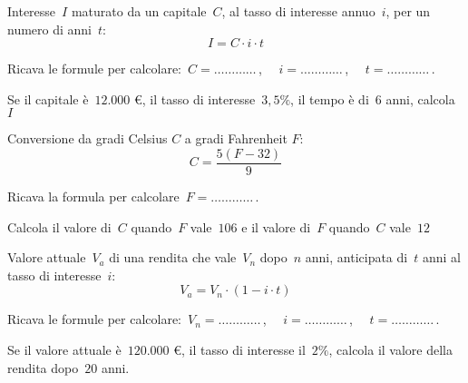 \subsubsection*{}

\begin{esercizio}
\label{ese:20.53}
Interesse~\(I\) maturato da un capitale~\(C\), al tasso di interesse annuo~\(i\), 
per un numero di anni~\(t\):
\begin{equation*}
  I=C\cdot i\cdot t
\end{equation*}

Ricava le formule per calcolare:~\(C=\ldots\ldots\ldots\ldots\)\,, \(\quad 
i=\ldots\ldots\ldots\ldots\)\,, \(\quad t =\ldots\ldots\ldots\ldots\)\,.

Se il capitale è~\(12.000\) €, il tasso di interesse~\(3,5\%\), il tempo è di~\(6\) 
anni, calcola~\(I\)
\end{esercizio}

\begin{esercizio}
\label{ese:20.54}
Conversione da gradi Celsius \(C\) a gradi Fahrenheit \(F\):
\begin{equation*}
  C=\frac{5(F-32)}{9}
\end{equation*}

Ricava la formula per calcolare\, \(F=\ldots\ldots\ldots\ldots\)\,.

Calcola il valore di~\(C\) quando~\(F\) vale~\(106\) e il valore di~\(F\) 
quando~\(C\) vale~\(12\)
\end{esercizio}

\begin{esercizio}
\label{ese:20.55}
Valore attuale~\(V_a\) di una rendita che vale~\(V_n\) dopo~\(n\) anni, 
anticipata di~\(t\) anni al tasso di interesse~\(i\):
\begin{equation*}
  V_{a}=V_{n}\cdot (1-i\cdot t)
\end{equation*}

Ricava le formule per calcolare:~\(V_n=\ldots\ldots\ldots\ldots\)\,, \(\quad 
i=\ldots\ldots\ldots\ldots\)\,, \(\quad t =\ldots\ldots\ldots\ldots\)\,.

Se il valore attuale è~\(120.000\) €, il tasso di interesse il~\(2\%\), 
calcola il valore della rendita dopo~\(20\) anni.
\end{esercizio}

